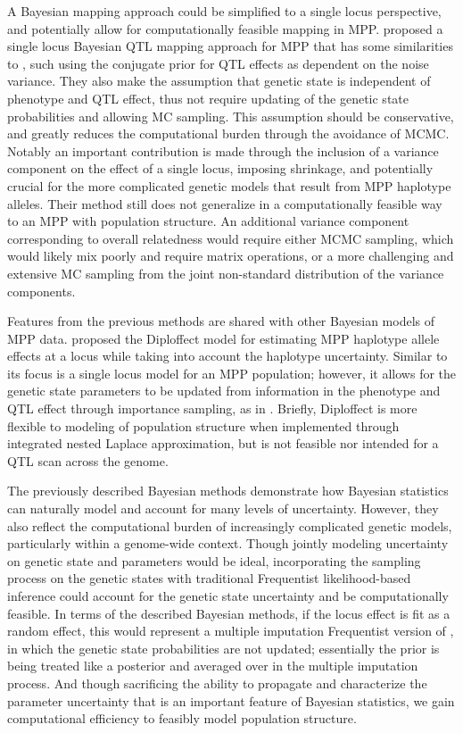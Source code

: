A Bayesian mapping approach could be simplified to a single locus perspective, and potentially allow for computationally feasible mapping in MPP. \cite{Durrant2010} proposed a single locus Bayesian QTL mapping approach for MPP that has some similarities to \cite{Sen2001}, such using the conjugate prior for QTL effects as dependent on the noise variance. They also make the assumption that genetic state is independent of phenotype and QTL effect, thus not require updating of the genetic state probabilities and allowing MC sampling. This assumption should be conservative, and greatly reduces the computational burden through the avoidance of MCMC. Notably an important contribution is made through the inclusion of a variance component on the effect of a single locus, imposing shrinkage, and potentially crucial for the more complicated genetic models that result from MPP haplotype alleles. Their method still does not generalize in a computationally feasible way to an MPP with population structure. An additional variance component corresponding to overall relatedness would require either MCMC sampling, which would likely mix poorly and require matrix operations, or a more challenging and extensive MC sampling from the joint non-standard distribution of the variance components.

Features from the previous methods are shared with other Bayesian models of MPP data. \citep{Zhang2014} proposed the Diploffect model for estimating MPP haplotype allele effects at a locus while taking into account the haplotype uncertainty. Similar to \cite{Durrant2010} its focus is a single locus model for an MPP population; however, it allows for the genetic state parameters to be updated from information in the phenotype and QTL effect through importance sampling, as in \cite{Sen2001}. Briefly, Diploffect is more flexible to modeling of population structure when implemented through integrated nested Laplace approximation, but is not feasible nor intended for a QTL scan across the genome.

The previously described Bayesian methods demonstrate how Bayesian statistics can naturally model and account for many levels of uncertainty. However, they also reflect the computational burden of increasingly complicated genetic models, particularly within a genome-wide context. Though jointly modeling uncertainty on genetic state and parameters would be ideal, incorporating the sampling process on the genetic states with traditional Frequentist likelihood-based inference could account for the genetic state uncertainty and be computationally feasible. In terms of the described Bayesian methods, if the locus effect is fit as a random effect, this would represent a multiple imputation Frequentist version of \cite{Durrant2010}, in which the genetic state probabilities are not updated; essentially the prior is being treated like a posterior and averaged over in the multiple imputation process. And though sacrificing the ability to propagate and characterize the parameter uncertainty that is an important feature of Bayesian statistics, we gain computational efficiency to feasibly model population structure. 

